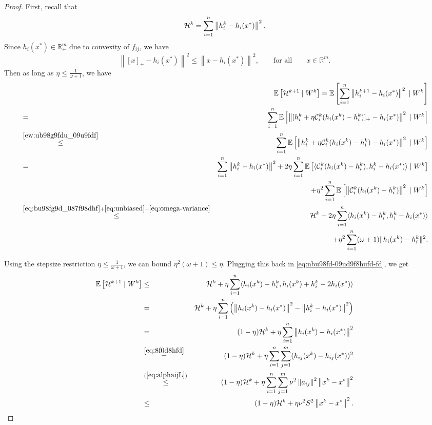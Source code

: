 \documentclass[12pt]{article}
\newcommand{\R}{\mathbb{R}}
\newcommand{\ExpBr}[1]{\mathbb{E}\left[#1\right]}
\newcommand{\norm}[1]{\left\|#1\right\|}
\newcommand{\cC}{{\mathcal{C}}}
\begin{document}
\begin{proof}
First, recall that
\begin{equation}\label{eq:bu98fg9d_087f98dhf}{\cal H}^{k} =   \sum_{i=1}^n \norm{h_i^{k} - h_i(x^*)}^2 .\end{equation}Since $h_{i}(x^*) \in \R^m_+$ due to convexity of $f_{ij}$, we have \begin{equation} \label{ew:ub98g9fdu_09u9fdf}\norm{[x]_+ - h_i(x^*)}^2 \leq \norm{x - h_i(x^*)}^2, \qquad \text{for all} \qquad x \in \R^m.\end{equation} Then as long as $\eta \leq \frac{1}{\omega+1}$, we have 
\begin{eqnarray}
&&\ExpBr{{\cal H}^{k+1} \;|\; W^k}	= \ExpBr{  \sum_{i=1}^n \norm{h_i^{k+1} - h_i(x^*)}^2  \;|\; W^k} \notag \\ 
	&=&  \sum_{i=1}^n\ExpBr{  \norm{ [h^k_i + \eta \cC_i^k(h_i(x^k) - h^k_i)]_+ - h_i(x^*) }^2  \;|\; W^k} \notag  \\ 
	&\overset{\eqref{ew:ub98g9fdu_09u9fdf}}{\leq} &    \sum_{i=1}^n \ExpBr{\norm{ h^k_i + \eta \cC_i^k(h_i(x^k) - h^k_i) - h_i(x^*) }^2 \;|\; W^k }\notag  \\ 
	&=& \sum_{i=1}^n  \norm{ h_i^k - h_i(x^*) }^2   + 2 \eta\sum_{i=1}^n \ExpBr{  \langle  \cC_i^k(h_i(x^k) - h_i^k),  h_i^k - h_i(x^*) \rangle \;|\; W^k}\notag  \\
	&& \qquad + \eta^2 \sum_{i=1}^n \ExpBr{ \norm{\cC_i^k(h_i(x^k) - h_i^k) }^2 \;|\; W^k} \notag \\ 
	&\overset{\eqref{eq:bu98fg9d_087f98dhf}+\eqref{eq:unbiased} + \eqref{eq:omega-variance}}{\leq} &  {\cal H}^k  + 2\eta \sum_{i=1}^n    \langle  h_i(x^k) - h_i^k, h_i^k - h_i(x^*) \rangle\notag\\
	&& \quad + \eta^2 \sum_{i=1}^n  (\omega+1) \|h_i(x^k) - h_i^k\|^2 .\label{eq:nbu98fd-09ud9f8hufd-fd}
	\end{eqnarray}
	
\noindent Using the stepsize restriction $\eta \leq \frac{1}{\omega+1}$, we can bound $\eta^2 (\omega+1) \leq \eta$. Plugging this back in  \eqref{eq:nbu98fd-09ud9f8hufd-fd}, we get
\begin{eqnarray*}
\ExpBr{{\cal H}^{k+1} \;|\; W^k}
	&\leq &  {\cal H}^k  + \eta  \sum_{i=1}^n   \langle h_i(x^k) - h_i^k, h_i(x^k) + h_i^k - 2h_i(x^*) \rangle  \\ 
	&=&  {\cal H}^k  + \eta \sum_{i=1}^n  \left( \norm{h_i(x^k) - h_i(x^*)}^2 - \norm{h_i^k - h_i(x^*)}^2\right)   \\ 
	&=& (1-\eta) {\cal H}^k  + \eta \sum_{i=1}^n  \norm{h_i(x^k) - h_i(x^*)}^2  \\ 
		&\overset{\eqref{eq:8f0d8hfd}}{=} & (1-\eta) {\cal H}^k  + \eta \sum_{i=1}^n  \sum_{j=1}^m (h_{ij}(x^k) - h_{ij}(x^*))^2  \\ 
	&\overset{(\ref{eq:alphaijL})}{\leq}&  (1-\eta) {\cal H}^k + \eta\sum_{i=1}^n \sum_{j=1}^m \nu^2 \norm{a_{ij}}^2 \norm{x^k - x^*}^2 \\ 
	&\leq&  (1-\eta) {\cal H}^k +  \eta \nu^2 S^2 \norm{x^k - x^*}^2. 
\end{eqnarray*}

\end{proof}
\end{document}
